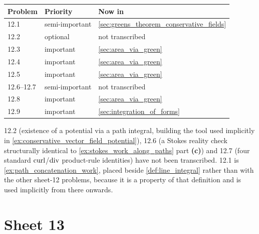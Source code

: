 \begin{center}
\begin{tabular}{@{}l l l@{}}
\textbf{Problem} & \textbf{Priority} & \textbf{Now in} \\
\hline
12.1 & semi-important & \cref{sec:greens_theorem_conservative_fields} \\[3pt]
12.2 & optional & not transcribed \\[3pt]
12.3 & important & \cref{sec:area_via_green} \\[3pt]
12.4 & important & \cref{sec:area_via_green} \\[3pt]
12.5 & important & \cref{sec:area_via_green} \\[3pt]
12.6--12.7 & semi-important & not transcribed \\[3pt]
12.8 & important & \cref{sec:area_via_green} \\[3pt]
12.9 & important & \cref{sec:integration_of_forms} \\
\end{tabular}
\end{center}

\begin{ainote}
12.2 (existence of a potential via a path integral, building the tool used implicitly in
\cref{ex:conservative_vector_field_potential}), 12.6 (a Stokes reality check structurally identical to \cref{ex:stokes_work_along_paths} part
\textbf{(c)}) and 12.7 (four standard $\operatorname{curl}$/$\operatorname{div}$ product-rule identities) have not been
transcribed. 12.1 is \cref{ex:path_concatenation_work}, placed beside \cref{def:line_integral}
rather than with the other sheet-12 problems, because it is a property of that definition and is
used implicitly from there onwards.
\end{ainote}

\section{Sheet 13}
\label{sec:sheet_index_13}


